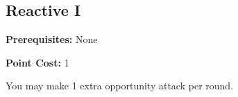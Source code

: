 \subsection{Reactive I}\label{feat:reactive1}

\noindent
\textbf{Prerequisites:} None

\noindent
\textbf{Point Cost:} 1

You may make 1 extra opportunity attack per round.
